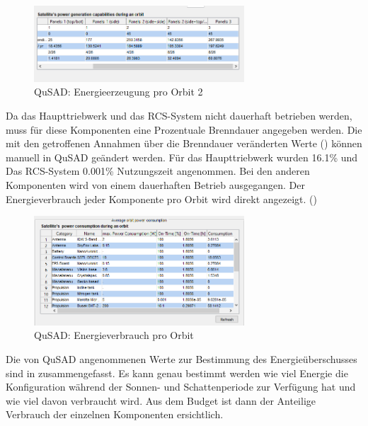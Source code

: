 			\begin{figure}[H]
				\centering
					\includegraphics[width=0.70\textwidth]{graphics/power4.PNG}
				\caption{QuSAD: Energieerzeugung pro Orbit 2}
				\label{fig:power4}
			\end{figure}
Da das Haupttriebwerk und das RCS-System nicht dauerhaft betrieben werden, muss für diese Komponenten eine Prozentuale Brenndauer angegeben werden. Die mit den getroffenen Annahmen über die Brenndauer veränderten Werte  () können manuell in QuSAD geändert werden. Für das Haupttriebwerk wurden \num{16,1}\% und Das RCS-System \num{0,001}\% Nutzungszeit angenommen. Bei den anderen Komponenten wird von einem dauerhaften Betrieb ausgegangen. Der Energieverbrauch jeder Komponente pro Orbit wird direkt angezeigt. ()
			
			\begin{figure}[H]
				\centering
					\includegraphics[width=0.70\textwidth]{graphics/power5.png}
				\caption{QuSAD: Energieverbrauch pro Orbit}
				\label{fig:power5}
			\end{figure}
Die von QuSAD angenommenen Werte zur Bestimmung des Energieüberschusses sind in   zusammengefasst. Es kann genau bestimmt werden wie viel Energie die Konfiguration während der Sonnen- und Schattenperiode zur Verfügung hat und wie viel davon verbraucht wird. Aus dem Budget ist dann der Anteilige Verbrauch der 
einzelnen Komponenten ersichtlich.


